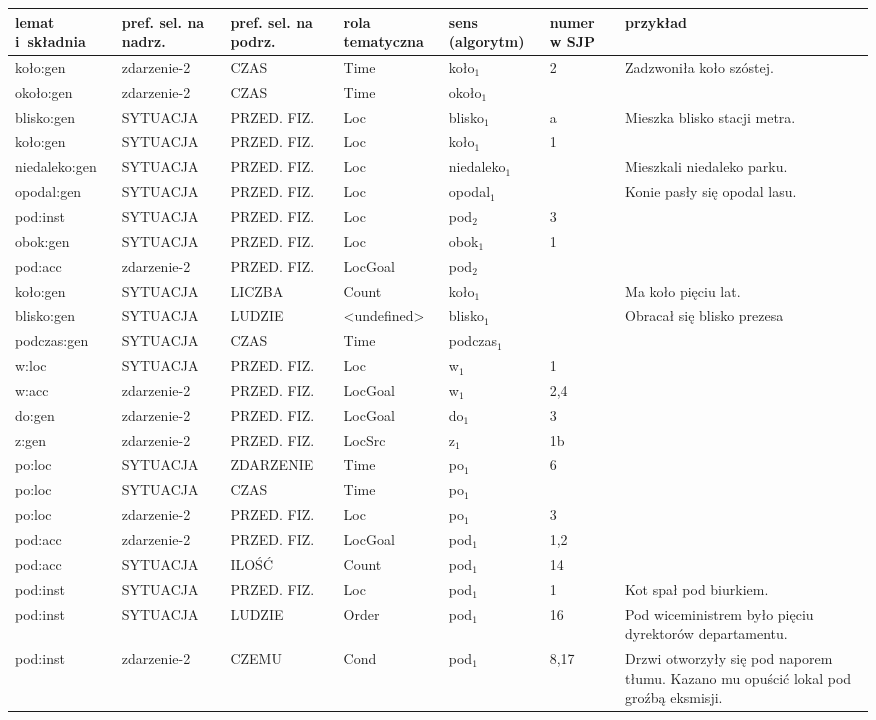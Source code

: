 \documentclass[a4paper, 12pt]{article}
\theoremstyle{remark}
\begin{document}

\begin{sidewaystable}
\centering
{%
\begin{tabular}{|p{2.5cm}|p{2.5cm}|p{2.5cm}|p{2cm}|p{2cm}|p{2cm}|p{9cm}|}
\hline
lemat i~składnia & pref. sel. na nadrz. & pref. sel. na podrz. & rola tematyczna & sens (algorytm) & numer w SJP & przykład \\ \hline
koło:gen & zdarzenie-2 & CZAS & Time & koło$_1$ & 2 & Zadzwoniła koło szóstej.\\
około:gen & zdarzenie-2 & CZAS & Time & około$_1$ & & \\
blisko:gen & SYTUACJA & PRZED. FIZ. & Loc & blisko$_1$ & a & Mieszka blisko stacji metra. \\
koło:gen & SYTUACJA & PRZED. FIZ. & Loc & koło$_1$ &  1& \\
niedaleko:gen & SYTUACJA & PRZED. FIZ. & Loc & niedaleko$_1$ & & Mieszkali niedaleko parku. \\
opodal:gen & SYTUACJA & PRZED. FIZ. & Loc & opodal$_1$ & & Konie pasły się opodal lasu. \\
pod:inst & SYTUACJA & PRZED. FIZ. & Loc & pod$_2$ &  3& \\
obok:gen & SYTUACJA & PRZED. FIZ. & Loc & obok$_1$ &  1& \\
pod:acc & zdarzenie-2 & PRZED. FIZ. & LocGoal & pod$_2$ & & \\
koło:gen & SYTUACJA & LICZBA & Count & koło$_1$ & & Ma koło pięciu lat. \\
blisko:gen & SYTUACJA & LUDZIE & <undefined> & blisko$_1$ & & Obracał się blisko prezesa \\
podczas:gen & SYTUACJA & CZAS & Time & podczas$_1$ & & \\
w:loc & SYTUACJA & PRZED. FIZ. & Loc & w$_1$ & 1 & \\
w:acc & zdarzenie-2 & PRZED. FIZ. & LocGoal & w$_1$ & 2,4 & \\
do:gen & zdarzenie-2 & PRZED. FIZ. & LocGoal & do$_1$ & 3 & \\
z:gen & zdarzenie-2 & PRZED. FIZ. & LocSrc & z$_1$ & 1b & \\
po:loc & SYTUACJA & ZDARZENIE & Time & po$_1$ & 6 & \\
po:loc & SYTUACJA & CZAS & Time & po$_1$ & & \\
po:loc & zdarzenie-2 & PRZED. FIZ. & Loc & po$_1$ & 3 & \\
pod:acc & zdarzenie-2 & PRZED. FIZ. & LocGoal & pod$_1$ & 1,2 & \\
pod:acc & SYTUACJA & ILOŚĆ & Count & pod$_1$ & 14 & \\
pod:inst & SYTUACJA & PRZED. FIZ. & Loc & pod$_1$ & 1 & Kot spał pod biurkiem. \\
pod:inst & SYTUACJA & LUDZIE & Order & pod$_1$ & 16 & Pod wiceministrem było pięciu dyrektorów departamentu. \\
pod:inst & zdarzenie-2 & CZEMU & Cond & pod$_1$ & 8,17 & Drzwi otworzyły się pod naporem tłumu. Kazano mu opuścić lokal pod groźbą eksmisji. \\
\hline
\end{tabular}%
}
\end{sidewaystable}
\end{document}
